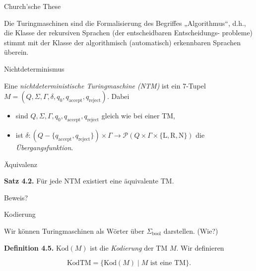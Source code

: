 \documentclass[11pt,aspectratio=169]{beamer}
\begin{document}
\begin{frame}{Church'sche These}
    
    \justifying

    Die Turingmaschinen sind die Formalisierung des Begriffes „Algorithmus“,
    d.h., die Klasse der rekursiven Sprachen (der entscheidbaren Entscheidungs-
    probleme) stimmt mit der Klasse der algorithmisch (automatisch) erkennbaren
    Sprachen überein.

\end{frame}

\begin{frame}{Nichtdeterminismus}
    
    \justifying

    Eine \textit{nichtdeterministische Turingmaschine (NTM)} ist ein 7-Tupel \\
    \(M = (Q, \Sigma, \Gamma, \delta, q_0, q_{\text{accept}}, q_{\text{reject}})\).
    Dabei

    \begin{itemize}
        \item sind \(Q, \Sigma, \Gamma, q_0, q_{\text{accept}}, q_{\text{reject}}\) gleich wie bei einer TM,
        \item ist \(\delta \colon (Q - \{q_{\text{accept}}, q_{\text{reject}}\}) \times \Gamma \to
            \mathcal P(Q \times \Gamma \times \{\text{L}, \text{R}, \text{N}\})\) die \textit{Übergangsfunktion}.
    \end{itemize}

\end{frame}

\begin{frame}{Äquivalenz}
    
    \textbf{Satz 4.2.} Für jede NTM existiert eine äquivalente TM.

    \vspace{1em}

    Beweis?
\end{frame}

\begin{frame}{Kodierung}

    Wir können Turingmaschinen als Wörter über \(\Sigma_{\text{bool}}\) darstellen. (Wie?)

    \vspace{1em}

    \textbf{Definition 4.5.}
    \(\text{Kod}(M)\) ist die \textit{Kodierung} der TM \(M\).
    Wir definieren

    \[
        \text{KodTM} = \{\text{Kod}(M) \mid M \text{ ist eine TM}\}.    
    \]

\end{frame}
\end{document}
